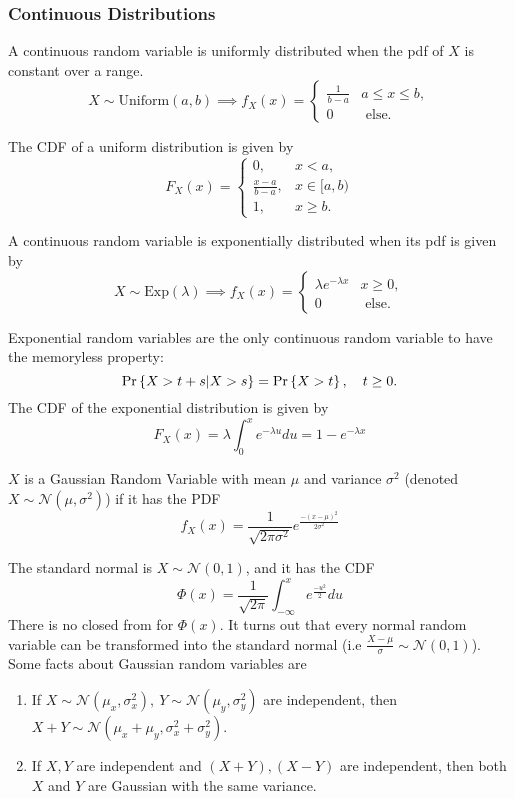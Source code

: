 \subsubsection{Continuous Distributions}
\begin{definition}
  A continuous random variable is uniformly distributed when the pdf of $X$ is constant over a range.
  \[
	X \sim \text{Uniform}(a, b) \implies f_X(x) = \begin{cases}
	  \frac{1}{b-a} & a \leq x \leq b,\\
	  0 & \text{ else.}
	\end{cases}
  \]
  \label{defn:crv-uniform}
\end{definition}
The CDF of a uniform distribution is given by
\[
  F_X(x) = \begin{cases}
	0, &  x < a,\\
	\frac{x-a}{b-a}, & x\in[a, b)\\
	1, & x \geq b.
  \end{cases}
\]
\begin{definition}
  A continuous random variable is exponentially distributed when its pdf is given by
  \[
	X \sim \text{Exp}(\lambda) \implies f_X(x) = \begin{cases}
	  \lambda e^{-\lambda x} & x \geq 0,\\
	  0 & \text{ else.}
	\end{cases}
  \]
  \label{defn:crv-exp}
\end{definition}
Exponential random variables are the only continuous random variable to have the memoryless property:
\[
  \text{Pr}\left\{X > t+s | X > s\right\} = \text{Pr}\left\{X > t\right\}, \quad t \geq 0.
\]
The CDF of the exponential distribution is given by
\[
  F_X(x) = \lambda \int_0^{x}e^{-\lambda u}du = 1 - e^{-\lambda x}
\]
\begin{definition}
  $X$ is a Gaussian Random Variable with mean $\mu$ and variance $\sigma^2$ (denoted $X\sim \mathcal{N}(\mu, \sigma^2)$) if it has the PDF
  \[
	f_X(x) = \frac{1}{\sqrt{2\pi\sigma^2}}e^{\frac{-(x-\mu)^2}{2\sigma^2}}
  \]
  \label{defn:normal-rv}
\end{definition}
The standard normal is $X\sim\mathcal{N}(0, 1)$, and it has the CDF
\[
  \Phi(x) = \frac{1}{\sqrt{2\pi}}\int_{-\infty}^{x}e^{\frac{-u^2}{2}} du
\]
There is no closed from for $\Phi(x)$.
It turns out that every normal random variable can be transformed into the standard normal (i.e $\frac{X - \mu}{\sigma} \sim \mathcal{N}(0, 1)$).
Some facts about Gaussian random variables are
\begin{enumerate}
  \item If $X\sim\mathcal{N}(\mu_x, \sigma_x^2),\ Y\sim\mathcal{N}(\mu_y, \sigma_y^2)$ are independent, then $X+Y \sim \mathcal{N}(\mu_x+\mu_y, \sigma_x^2 + \sigma_y^2)$.
  \item If $X,Y$ are independent and $(X+Y), (X-Y)$ are independent, then both $X$ and $Y$ are Gaussian with the same variance.
\end{enumerate}
